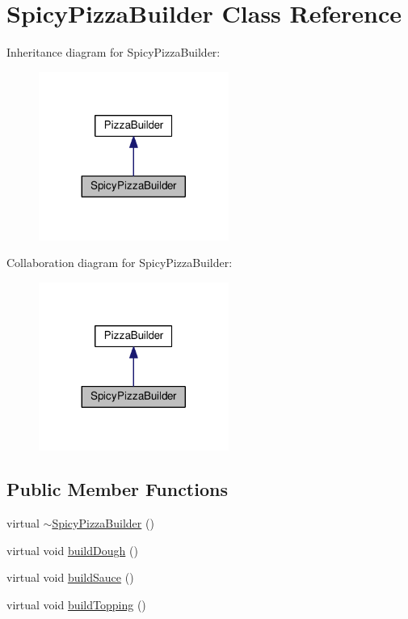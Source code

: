 \hypertarget{classSpicyPizzaBuilder}{}\section{Spicy\+Pizza\+Builder Class Reference}
\label{classSpicyPizzaBuilder}


Inheritance diagram for Spicy\+Pizza\+Builder\+:\nopagebreak
\begin{figure}[H]
\begin{center}
\leavevmode
\includegraphics[width=176pt]{classSpicyPizzaBuilder__inherit__graph}
\end{center}
\end{figure}


Collaboration diagram for Spicy\+Pizza\+Builder\+:\nopagebreak
\begin{figure}[H]
\begin{center}
\leavevmode
\includegraphics[width=176pt]{classSpicyPizzaBuilder__coll__graph}
\end{center}
\end{figure}
\subsection*{Public Member Functions}
\begin{DoxyCompactItemize}
\item 
virtual \hyperlink{classSpicyPizzaBuilder_ada134c577c76bbe33589074d1eca989b}{$\sim$\+Spicy\+Pizza\+Builder} ()
\item 
virtual void \hyperlink{classSpicyPizzaBuilder_a31a9b83aff106bf255cdd7b07428cc8f}{build\+Dough} ()
\item 
virtual void \hyperlink{classSpicyPizzaBuilder_a74a4d62a67d118b8bbe94721847f38b4}{build\+Sauce} ()
\item 
virtual void \hyperlink{classSpicyPizzaBuilder_a18fccc77e058f373deb851d61074df5b}{build\+Topping} ()
\end{DoxyCompactItemize}
